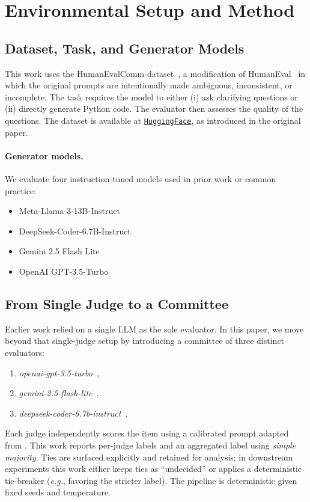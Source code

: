 \documentclass[acmsmall,screen,nonacm]{acmart}
\begin{document}
\section{Environmental Setup and Method}

\subsection{Dataset, Task, and Generator Models}
This work uses the HumanEvalComm dataset~\cite{WuFard2025HumanEvalComm}, a modification of HumanEval~\cite{Chen2021EvaluatingLLMs} in which the original prompts are intentionally made ambiguous, inconsistent, or incomplete. The task requires the model to either (i) ask clarifying questions or (ii) directly generate Python code. The evaluator then assesses the quality of the questions. The dataset is available at \href{https://huggingface.co/datasets/jie-jw-wu/HumanEvalComm}{\texttt{HuggingFace}}, as introduced in the original paper.

\paragraph{Generator models.} We evaluate four instruction-tuned models used in prior work or common practice:
\begin{itemize}[leftmargin=*,nosep]
  \item Meta-Llama-3-13B-Instruct~\cite{Llama3}
  \item DeepSeek-Coder-6.7B-Instruct~\cite{DeepSeekCoder}
  \item Gemini 2.5 Flash Lite~\cite{GeminiFlashLite}
  \item OpenAI GPT-3.5-Turbo~\cite{OpenAIgpt35}
\end{itemize}

\subsection{From Single Judge to a Committee}
Earlier work relied on a single LLM as the sole evaluator. In this paper, we move beyond that single-judge setup by introducing a committee of three distinct evaluators:
\begin{enumerate}[leftmargin=1.2em, itemsep=2pt]
  \item \emph{openai-gpt-3.5-turbo}~\cite{OpenAIgpt35},
  \item \emph{gemini-2.5-flash-lite}~\cite{GeminiFlashLite},
  \item \emph{deepseek-coder-6.7b-instruct}~\cite{DeepSeekCoder}.
\end{enumerate}
Each judge independently scores the item using a calibrated prompt adapted from \citet{WuFard2025HumanEvalComm}. This work reports per-judge labels and an aggregated label using \emph{simple majority}. Ties are surfaced explicitly and retained for analysis; in downstream experiments this work either keeps ties as ``undecided'' or applies a deterministic tie-breaker (\emph{e.g.}, favoring the stricter label). The pipeline is deterministic given fixed seeds and temperature.
\end{document}
